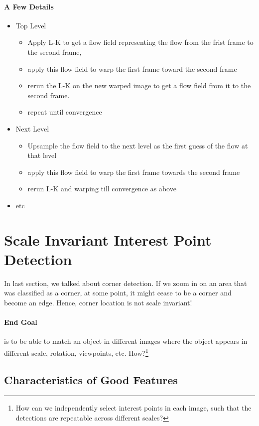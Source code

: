 \documentclass[11pt]{article}
\begin{document}
\paragraph{A Few Details}
\begin{itemize}
	\item Top Level
	\begin{itemize}
		\item Apply L-K to get a flow field representing the flow from the frist frame to the second frame, 
		\item apply this flow field to warp the first frame toward the second frame
		\item rerun the L-K on the new warped image to get a flow field from it to the second frame. 
		\item repeat until convergence
	\end{itemize}
	\item Next Level
	\begin{itemize}
		\item Upsample the flow field to the next level as the first guess of the flow at that level
		\item apply this flow field to warp the first frame towards the second frame
		\item rerun L-K and warping till convergence as above
	\end{itemize}
	\item etc
\end{itemize}

\section{Scale Invariant Interest Point Detection}
In last section, we talked about corner detection. If we zoom in on an area that was classified as a corner, at some point, it might cease to be a corner and become an edge. Hence, corner location is not scale invariant! 

\paragraph{End Goal} is to be able to match an object in different images where the object appears in different scale, rotation, viewpoints, etc. How?\footnote{How can we independently select interest points in each image, such that the detections are repeatable across different scales?}

\subsection{Characteristics of Good Features}
\end{document}
